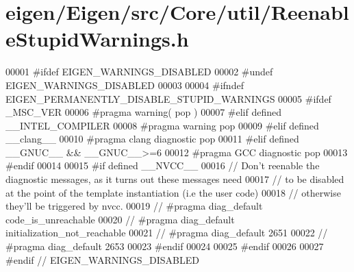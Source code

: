 \hypertarget{eigen_2_eigen_2src_2_core_2util_2_reenable_stupid_warnings_8h_source}{}\section{eigen/\+Eigen/src/\+Core/util/\+Reenable\+Stupid\+Warnings.h}
\label{eigen_2_eigen_2src_2_core_2util_2_reenable_stupid_warnings_8h_source}

\begin{DoxyCode}
00001 \textcolor{preprocessor}{#ifdef EIGEN\_WARNINGS\_DISABLED}
00002 \textcolor{preprocessor}{#undef EIGEN\_WARNINGS\_DISABLED}
00003 
00004 \textcolor{preprocessor}{#ifndef EIGEN\_PERMANENTLY\_DISABLE\_STUPID\_WARNINGS}
00005 \textcolor{preprocessor}{  #ifdef \_MSC\_VER}
00006 \textcolor{preprocessor}{    #pragma warning( pop )}
00007 \textcolor{preprocessor}{  #elif defined \_\_INTEL\_COMPILER}
00008 \textcolor{preprocessor}{    #pragma warning pop}
00009 \textcolor{preprocessor}{  #elif defined \_\_clang\_\_}
00010 \textcolor{preprocessor}{    #pragma clang diagnostic pop}
00011 \textcolor{preprocessor}{  #elif defined \_\_GNUC\_\_ && \_\_GNUC\_\_>=6}
00012 \textcolor{preprocessor}{    #pragma GCC diagnostic pop}
00013 \textcolor{preprocessor}{  #endif}
00014 
00015 \textcolor{preprocessor}{  #if defined \_\_NVCC\_\_}
00016 \textcolor{comment}{//    Don't reenable the diagnostic messages, as it turns out these messages need}
00017 \textcolor{comment}{//    to be disabled at the point of the template instantiation (i.e the user code)}
00018 \textcolor{comment}{//    otherwise they'll be triggered by nvcc.}
00019 \textcolor{comment}{//    #pragma diag\_default code\_is\_unreachable}
00020 \textcolor{comment}{//    #pragma diag\_default initialization\_not\_reachable}
00021 \textcolor{comment}{//    #pragma diag\_default 2651}
00022 \textcolor{comment}{//    #pragma diag\_default 2653}
00023 \textcolor{preprocessor}{  #endif}
00024 
00025 \textcolor{preprocessor}{#endif}
00026 
00027 \textcolor{preprocessor}{#endif // EIGEN\_WARNINGS\_DISABLED}
\end{DoxyCode}
